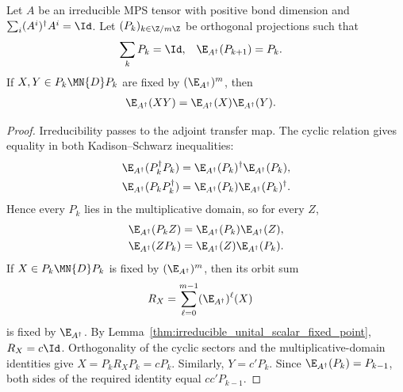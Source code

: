 \begin{lemma}%
    \label{thm:sector_fixed_point_algebra_rigidity}
    \leanok
    Let $A$ be an irreducible MPS tensor with positive bond dimension and
    $\sum_i(A^i)^\dagger A^i=\Id$. Let $(P_k)_{k\in\Z/m\Z}$ be orthogonal
    projections such that
    \begin{align}
        \sum_kP_k & =\Id,
                  & \E_{A^\dagger}(P_{k+1}) & =P_k.
        \notag
    \end{align}
    If $X,Y\in P_k\MN{D}P_k$ are fixed by $(\E_{A^\dagger})^m$, then
    \begin{align}
        \E_{A^\dagger}(XY)
         & =\E_{A^\dagger}(X)\E_{A^\dagger}(Y).
        \notag
    \end{align}
\end{lemma}

\begin{proof}\leanok
    Irreducibility passes to the adjoint transfer map. The cyclic relation
    gives equality in both Kadison--Schwarz inequalities:
    \begin{align}
        \E_{A^\dagger}(P_k^\dagger P_k)
         & =\E_{A^\dagger}(P_k)^\dagger\E_{A^\dagger}(P_k),
        \notag                                              \\
        \E_{A^\dagger}(P_kP_k^\dagger)
         & =\E_{A^\dagger}(P_k)\E_{A^\dagger}(P_k)^\dagger.
        \notag
    \end{align}
    Hence every $P_k$ lies in the multiplicative domain, so for every $Z$,
    \begin{align}
        \E_{A^\dagger}(P_kZ)
         & =\E_{A^\dagger}(P_k)\E_{A^\dagger}(Z),
        \notag                                    \\
        \E_{A^\dagger}(ZP_k)
         & =\E_{A^\dagger}(Z)\E_{A^\dagger}(P_k).
        \notag
    \end{align}
    If $X\in P_k\MN{D}P_k$ is fixed by
    $(\E_{A^\dagger})^m$, then its orbit sum
    \begin{align}
        R_X & =\sum_{\ell=0}^{m-1}(\E_{A^\dagger})^\ell(X)
        \notag
    \end{align}
    is fixed by $\E_{A^\dagger}$. By
    Lemma~\ref{thm:irreducible_unital_scalar_fixed_point}, $R_X=c\Id$.
    Orthogonality of the cyclic sectors and the multiplicative-domain
    identities give $X=P_kR_XP_k=cP_k$. Similarly, $Y=c'P_k$. Since
    $\E_{A^\dagger}(P_k)=P_{k-1}$, both sides of the required identity equal
    $cc'P_{k-1}$.
\end{proof}

